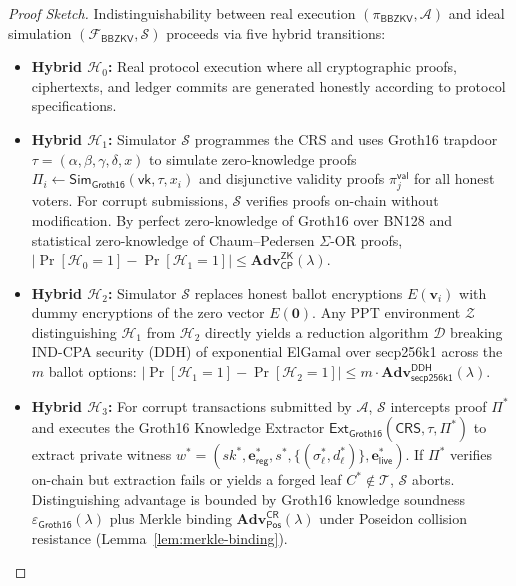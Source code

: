 \documentclass[10pt,letterpaper,journal]{IEEEtran}
\begin{document}
\begin{proof}[Proof Sketch]
Indistinguishability between real execution $(\pi_{\mathsf{BBZKV}}, \mathcal{A})$ and ideal simulation $(\mathcal{F}_{\mathsf{BBZKV}}, \mathcal{S})$ proceeds via five hybrid transitions:
\begin{itemize}[leftmargin=*,noitemsep,topsep=1pt]
  \item \textbf{Hybrid $\mathcal{H}_0$:} Real protocol execution where all cryptographic proofs, ciphertexts, and ledger commits are generated honestly according to protocol specifications.
  \item \textbf{Hybrid $\mathcal{H}_1$:} Simulator $\mathcal{S}$ programmes the CRS and uses Groth16 trapdoor $\tau = (\alpha, \beta, \gamma, \delta, x)$ to simulate zero-knowledge proofs $\Pi_i \leftarrow \mathsf{Sim}_{\mathsf{Groth16}}(\mathsf{vk}, \tau, x_i)$ and disjunctive validity proofs $\pi_j^{\mathsf{val}}$ for all honest voters. For corrupt submissions, $\mathcal{S}$ verifies proofs on-chain without modification. By perfect zero-knowledge of Groth16 over BN128 and statistical zero-knowledge of Chaum--Pedersen $\Sigma$-OR proofs, $|\Pr[\mathcal{H}_0 = 1] - \Pr[\mathcal{H}_1 = 1]| \leq \mathbf{Adv}_{\mathsf{CP}}^{\mathsf{ZK}}(\lambda)$.
  \item \textbf{Hybrid $\mathcal{H}_2$:} Simulator $\mathcal{S}$ replaces honest ballot encryptions $E(\mathbf{v}_i)$ with dummy encryptions of the zero vector $E(\mathbf{0})$. Any PPT environment $\mathcal{Z}$ distinguishing $\mathcal{H}_1$ from $\mathcal{H}_2$ directly yields a reduction algorithm $\mathcal{D}$ breaking IND-CPA security (DDH) of exponential ElGamal over secp256k1 across the $m$ ballot options: $|\Pr[\mathcal{H}_1 = 1] - \Pr[\mathcal{H}_2 = 1]| \leq m \cdot \mathbf{Adv}_{\mathsf{secp256k1}}^{\mathsf{DDH}}(\lambda)$.
  \item \textbf{Hybrid $\mathcal{H}_3$:} For corrupt transactions submitted by $\mathcal{A}$, $\mathcal{S}$ intercepts proof $\Pi^\ast$ and executes the Groth16 Knowledge Extractor $\mathsf{Ext}_{\mathsf{Groth16}}(\mathsf{CRS}, \tau, \Pi^\ast)$ to extract private witness $w^\ast = (sk^\ast, \mathbf{e}_{\mathsf{reg}}^\ast, s^\ast, \{(\sigma_\ell^\ast, d_\ell^\ast)\}, \mathbf{e}_{\mathsf{live}}^\ast)$. If $\Pi^\ast$ verifies on-chain but extraction fails or yields a forged leaf $C^\ast \notin \mathcal{T}$, $\mathcal{S}$ aborts. Distinguishing advantage is bounded by Groth16 knowledge soundness $\varepsilon_{\mathsf{Groth16}}(\lambda)$ plus Merkle binding $\mathbf{Adv}_{\mathsf{Pos}}^{\mathsf{CR}}(\lambda)$ under Poseidon collision resistance (Lemma~\ref{lem:merkle-binding}).

\end{itemize}
\end{proof}
\end{document}
